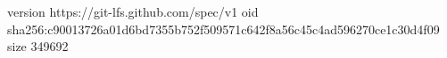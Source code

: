 version https://git-lfs.github.com/spec/v1
oid sha256:c90013726a01d6bd7355b752f509571c642f8a56c45c4ad596270ce1c30d4f09
size 349692
